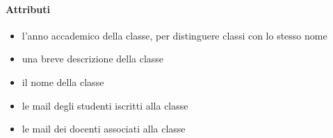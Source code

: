 \paragraph{Attributi}
\begin{itemize}
\item {}
\newline
l'anno accademico della classe, per distinguere classi con lo stesso nome
\item {}
\newline
una breve descrizione della classe
\item {}
\newline
il nome della classe
\item {}
\newline
le mail degli studenti iscritti alla classe
\item {}
\newline
le mail dei docenti associati alla classe
\end{itemize}
